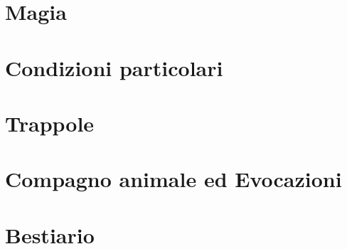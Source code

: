 \documentclass[10pt]{article} %
\begin{document}
\section{Magia}

\clearpage 

\section{Condizioni particolari}

\clearpage

\section{Trappole}

\clearpage 

\section{Compagno animale ed Evocazioni}

\clearpage 

\section{Bestiario}

\clearpage 
\end{document}
